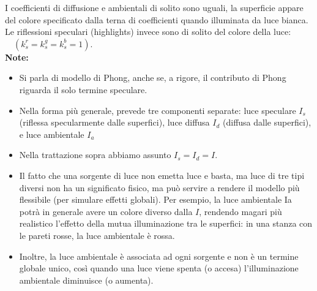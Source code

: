 \documentclass[a4paper, 10pt]{article}
\begin{document}
			I coefficienti di diffusione e ambientali di solito sono uguali, la superficie appare del colore specificato dalla terna di coefficienti quando illuminata da luce bianca.
			Le riflessioni speculari (highlights) invece sono di solito del colore
			della luce: $ \quad (k_s^r = k_s^g = k_s^b = 1) $.\\
			
			\textbf{Note:}
			\begin{itemize}
				\item Si parla di modello di Phong, anche se, a rigore, il contributo di Phong
				riguarda il solo termine speculare.
				\item Nella forma più generale, prevede tre componenti separate: luce
				speculare $ I_s $ (riflessa specularmente dalle superfici), luce diffusa $ I_d $
				(diffusa dalle superfici), e luce ambientale $ I_a $
				\item Nella trattazione sopra abbiamo assunto $ I_s =I_d = I $.
				\item Il fatto che una sorgente di luce non emetta luce e basta, ma luce di tre
				tipi diversi non ha un significato fisico, ma può servire a rendere il
				modello più flessibile (per simulare effetti globali). Per esempio, la luce
				ambientale Ia potrà in generale avere un colore diverso dalla $ I $,
				rendendo magari più realistico l’effetto della mutua illuminazione tra le
				superfici: in una stanza con le pareti rosse, la luce ambientale è rossa.
				\item Inoltre, la luce ambientale è associata ad ogni sorgente e non è un
				termine globale unico, così quando una luce viene spenta (o accesa)
				l’illuminazione ambientale diminuisce (o aumenta).
			\end{itemize}
\end{document}
